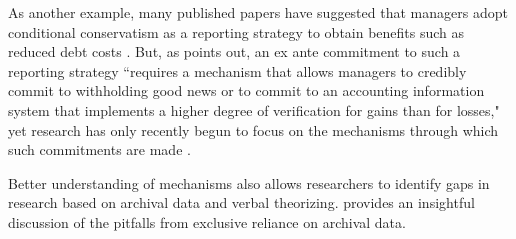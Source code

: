 \documentclass[11pt,reqno]{amsart}
\begin{document}
\begin{doublespace}
As another example, many published papers have suggested that managers adopt conditional conservatism as a reporting strategy to obtain benefits such as reduced debt costs \citep{Ahmed:2002aa,Zhang:2008bc}.
But, as \citet[p\,317]{Beyer:2010cj} points out, an ex ante commitment to such a reporting strategy ``requires a mechanism that allows managers to credibly commit to withholding good news or to commit to an accounting information system that implements a higher degree of verification for gains than for losses," yet research has only recently begun to focus on the mechanisms through which such commitments are made \citep[e.g.,][]{Erkens:2014hj}.

Better understanding of mechanisms also allows researchers to identify gaps in research based on archival data and verbal theorizing.
\cite{Soltes:2014gr} provides an insightful discussion of the pitfalls from exclusive reliance on archival data. 








\end{doublespace}
\end{document}
